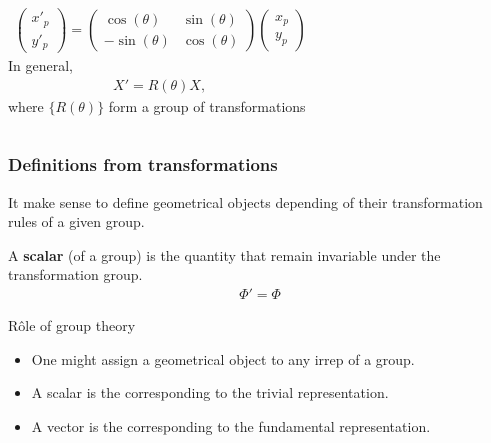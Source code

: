 \begin{frame}[t]
\begin{center}
    \end{center}
  \begin{columns}
    {\small
      \begin{align*}
        \begin{pmatrix}
          x'_p\\ y'_p
        \end{pmatrix} = 
        \begin{pmatrix}
          \cos(\theta) & \sin(\theta)\\
          -\sin(\theta) & \cos(\theta)
        \end{pmatrix}
        \begin{pmatrix}
          x_p\\ y_p
        \end{pmatrix}
      \end{align*}
    }
    In general,
    \begin{align*}
      X' = R(\theta) X,
    \end{align*}
    where $\{R(\theta)\}$ form a \alert{group} of transformations
  \end{columns}
\end{frame}

\begin{frame}[t]
  \frametitle{Definitions from transformations}
  It make sense to define \alert{geometrical objects} depending of their transformation rules of a given group.
  \begin{definition}%
    A {\bf \alert{scalar}} (of a group) is the quantity that remain invariable under the transformation group.
    \begin{align*}
      \Phi' = \Phi
    \end{align*}
  \end{definition}
  \pause
  \begin{alertblock}{R\^ole of group theory}
    \begin{itemize}%
    \item One might assign a geometrical object to any irrep of a group.
    \item A scalar is the corresponding to the trivial representation.
    \item A vector is the corresponding to the \alert{fundamental} representation.
    \end{itemize}
  \end{alertblock}
\end{frame}


